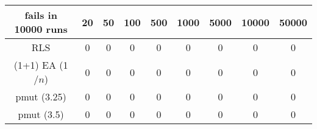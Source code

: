\begin{tabular}[h]{ccccccccc}
fails in 10000 runs&20&50&100&500&1000&5000&10000&50000\\\hline
RLS&0&0&0&0&0&0&0&0\\
(1+1) EA (1$/n$)&0&0&0&0&0&0&0&0\\
pmut (3.25)&0&0&0&0&0&0&0&0\\
pmut (3.5)&0&0&0&0&0&0&0&0\\
\end{tabular}
